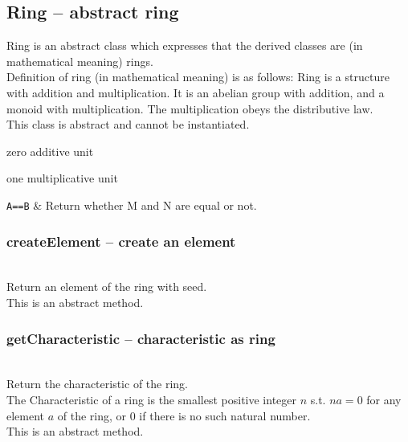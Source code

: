  \subsection{\negok Ring -- abstract ring}
  \quad Ring is an abstract class which expresses that
    the derived classes are (in mathematical meaning) rings.\\
  \spacing
  \quad Definition of ring (in mathematical meaning) is as follows:
  Ring is a structure with addition and multiplication. 
  It is an abelian group with addition, and a monoid with multiplication.
  The multiplication obeys the distributive law.\\
  \spacing
  This class is abstract and cannot be instantiated.\\
  \begin{at}
    \item[zero]  additive unit\\
    \item[one] multiplicative unit\\
  \end{at}
  \begin{op}
    \verb+A==B+ & Return whether M and N are equal or not.\\
  \end{op} 
  \method
  \subsubsection{createElement -- create an element}
   \\
   \spacing
   \quad Return an element of the ring with seed.\\
   \spacing
   \quad This is an abstract method.\\
   \spacing
  \subsubsection{getCharacteristic -- characteristic as ring}
   \\
   \spacing
   \quad Return the characteristic of the ring.\\
   \spacing
   \quad The Characteristic of a ring is the smallest positive integer $n$ 
   s.t. $na=0$ for any element $a$ of the ring, 
   or $0$ if there is no such natural number.\\
   This is an abstract method.\\
   \spacing
